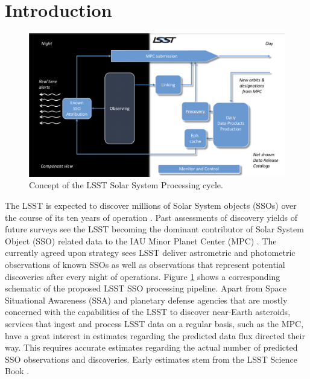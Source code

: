 \section{Introduction} \label{sec:intro}
\begin{figure}[tb!]
\begin{center}
\includegraphics[scale=0.27]{./figs/mops2.png}
\end{center}
\caption{Concept of the \gls{LSST} Solar System Processing cycle.}
\label{fig:mops}       %
\end{figure}
The \gls{LSST} is expected to discover millions of Solar System objects (SSOs) over the course of its ten years of operation \citep{jones2015asteroid}. 
Past assessments of discovery yields of future surveys see the \gls{LSST} becoming the dominant contributor of Solar System \gls{Object} (\gls{SSO}) related data to the \gls{IAU} Minor Planet \gls{Center} (\gls{MPC}) \citep{LSSTscibook2009}. The currently agreed upon strategy sees \gls{LSST} deliver astrometric and photometric observations of 
known SSOs as well as observations that represent potential discoveries after every night of operations.
Figure \ref{fig:mops} shows a corresponding schematic of the proposed \gls{LSST} \gls{SSO} processing \gls{pipeline}. 
Apart from Space Situational Awareness (\gls{SSA}) and planetary defense agencies that are mostly concerned with the capabilities of the \gls{LSST} to discover near-Earth asteroids, services that ingest and process \gls{LSST} data on a regular basis, such as the \gls{MPC}, 
have a great interest in estimates regarding the predicted data \gls{flux} directed their way. This requires accurate estimates regarding the actual number of predicted \gls{SSO} observations and discoveries. Early estimates stem from the \gls{LSST} Science Book \citep{LSSTscibook2009}. 
